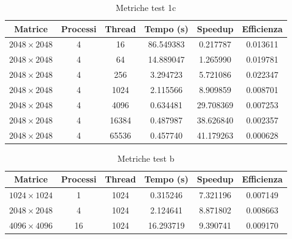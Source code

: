 \begin{table}[H]
    \centering
    \begin{tabular}{cccccc}
        \hline
        \textbf{Matrice}   & \textbf{Processi} & \textbf{Thread} & \textbf{Tempo (s)} & \textbf{Speedup} & \textbf{Efficienza} \\
        \hline
        $2048 \times 2048$ & 4                 & 16              & 86.549383          & 0.217787         & 0.013611            \\
        $2048 \times 2048$ & 4                 & 64              & 14.889047          & 1.265990         & 0.019781            \\
        $2048 \times 2048$ & 4                 & 256             & 3.294723           & 5.721086         & 0.022347            \\
        $2048 \times 2048$ & 4                 & 1024            & 2.115566           & 8.909859         & 0.008701            \\
        $2048 \times 2048$ & 4                 & 4096            & 0.634481           & 29.708369        & 0.007253            \\
        $2048 \times 2048$ & 4                 & 16384           & 0.487987           & 38.626840        & 0.002357            \\
        $2048 \times 2048$ & 4                 & 65536           & 0.457740           & 41.179263        & 0.000628            \\

        \hline
    \end{tabular}
    \caption{Metriche test 1c}
\end{table}

\begin{table}[H]
    \centering
    \begin{tabular}{cccccc}
        \hline
        \textbf{Matrice}   & \textbf{Processi} & \textbf{Thread} & \textbf{Tempo (s)} & \textbf{Speedup} & \textbf{Efficienza} \\
        \hline
        $1024 \times 1024$ & 1                 & 1024            & 0.315246           & 7.321196         & 0.007149            \\
        $2048 \times 2048$ & 4                 & 1024            & 2.124641           & 8.871802         & 0.008663            \\
        $4096 \times 4096$ & 16                & 1024            & 16.293719          & 9.390741         & 0.009170            \\
        \hline
    \end{tabular}
    \caption{Metriche test b}
\end{table}

